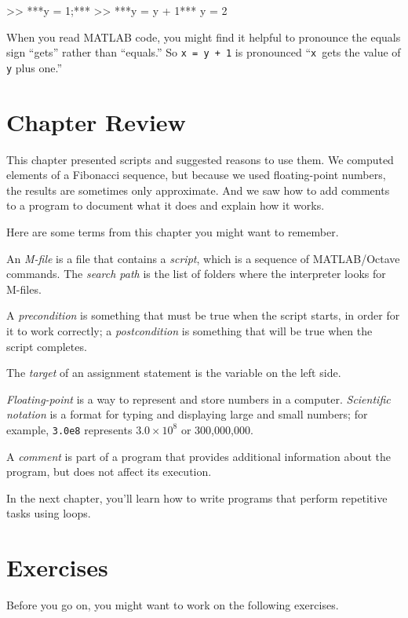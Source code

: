 \begin{code}
>> ***y = 1;***
>> ***y = y + 1***
y = 2
\end{code}

When you read MATLAB code, you might find it helpful to pronounce
the equals sign ``gets'' rather than ``equals.''  So \lstinline{x = y + 1}
is pronounced ``\lstinline{x}~gets the value of \lstinline{y} plus one.''

\section{Chapter Review}

This chapter presented scripts and suggested reasons to use them.  We computed elements of a Fibonacci sequence, but because we used floating-point numbers, the results are sometimes only approximate.
And we saw how to add comments to a program to document what it does and explain how it works.

Here are some terms from this chapter you might want to remember.

An {\em M-file} is a file that contains a {\em script}, which is a sequence of MATLAB/Octave commands.
The {\em search path} is the list of folders where the interpreter looks for
M-files.

A {\em precondition} is something that must be true when the script
starts, in order for it to work correctly; a {\em postcondition} is something that will be true when the script completes.

The {\em target} of an assignment statement is the variable on the left side.

{\em Floating-point} is a way to represent and store numbers in a computer.
{\em Scientific notation} is a format for typing and displaying large
and small numbers; for example, \lstinline{3.0e8} represents $3.0 \times 10^8$
or 300,000,000.

A {\em comment} is part of a program that provides additional information
about the program, but does not affect its execution.

In the next chapter, you'll learn how to write programs that perform repetitive tasks using loops.


\section{Exercises}

Before you go on, you might want to work on the following exercises.

